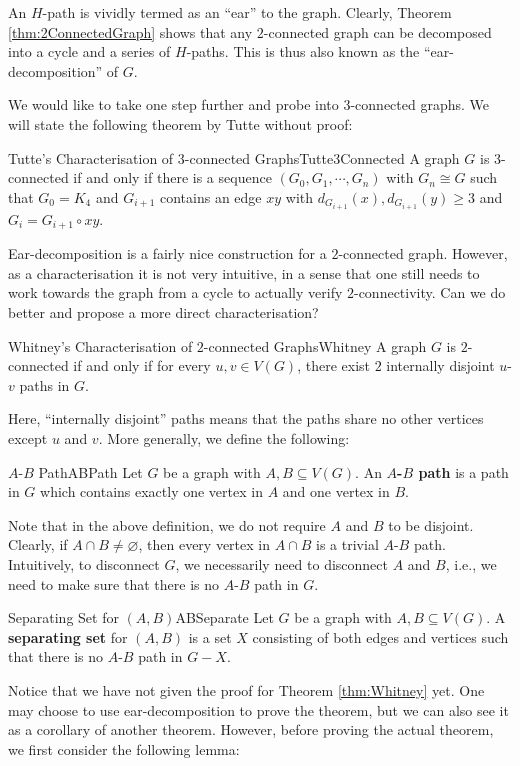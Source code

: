 \documentclass[math, code]{amznotes}
\theoremstyle{remark}
\begin{document}
An $H$-path is vividly termed as an ``ear'' to the graph. Clearly, Theorem \ref{thm:2ConnectedGraph} shows that any $2$-connected graph can be decomposed into a cycle and a series of $H$-paths. This is thus also known as the ``ear-decomposition'' of $G$.

We would like to take one step further and probe into $3$-connected graphs. We will state the following theorem by Tutte without proof:
\begin{thmbox}{Tutte's Characterisation of $3$-connected Graphs}{Tutte3Connected}
    A graph $G$ is $3$-connected if and only if there is a sequence $\left(G_0, G_1, \cdots, G_n\right)$ with $G_n \cong G$ such that $G_0 = K_4$ and $G_{i + 1}$ contains an edge $xy$ with $d_{G_{i + 1}}(x), d_{G_{i + 1}}(y) \geq 3$ and $G_i = G_{i + 1} \circ xy$. 
\end{thmbox}
Ear-decomposition is a fairly nice construction for a $2$-connected graph. However, as a characterisation it is not very intuitive, in a sense that one still needs to work towards the graph from a cycle to actually verify $2$-connectivity. Can we do better and propose a more direct characterisation?
\begin{thmbox}{Whitney's Characterisation of $2$-connected Graphs}{Whitney}
    A graph $G$ is $2$-connected if and only if for every $u, v \in V(G)$, there exist $2$ internally disjoint $u$-$v$ paths in $G$.
\end{thmbox}
Here, ``internally disjoint'' paths means that the paths share no other vertices except $u$ and $v$. More generally, we define the following:
\begin{dfnbox}{$A$-$B$ Path}{ABPath}
    Let $G$ be a graph with $A, B \subseteq V(G)$. An {\color{red} \textbf{$A$-$B$ path}} is a path in $G$ which contains exactly one vertex in $A$ and one vertex in $B$.
\end{dfnbox} 
Note that in the above definition, we do not require $A$ and $B$ to be disjoint. Clearly, if $A \cap B \neq \varnothing$, then every vertex in $A \cap B$ is a trivial $A$-$B$ path. Intuitively, to disconnect $G$, we necessarily need to disconnect $A$ and $B$, i.e., we need to make sure that there is no $A$-$B$ path in $G$.
\begin{dfnbox}{Separating Set for $(A, B)$}{ABSeparate}
    Let $G$ be a graph with $A, B \subseteq V(G)$. A {\color{red} \textbf{separating set}} for $(A, B)$ is a set $X$ consisting of both edges and vertices such that there is no $A$-$B$ path in $G - X$.
\end{dfnbox}
Notice that we have not given the proof for Theorem \ref{thm:Whitney} yet. One may choose to use ear-decomposition to prove the theorem, but we can also see it as a corollary of another theorem. However, before proving the actual theorem, we first consider the following lemma:
\end{document}
